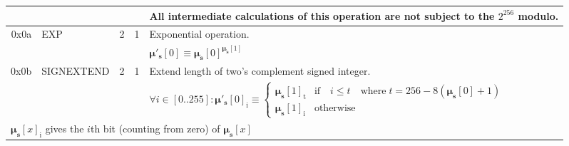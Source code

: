 \documentclass[9pt,oneside]{amsart}
\begin{document}
\begin{tabular*}{\columnwidth}[h]{rlrrl}
&&&& All intermediate calculations of this operation are not subject to the $2^{256}$ modulo. \\
\midrule
0x0a & {\small EXP} & 2 & 1 & Exponential operation. \\
&&&& $\boldsymbol{\mu}'_{\mathbf{s}}[0] \equiv \boldsymbol{\mu}_{\mathbf{s}}[0] ^ {\boldsymbol{\mu}_{\mathbf{s}}[1] }$ \\
\midrule
0x0b & {\small SIGNEXTEND} & 2 & 1 & Extend length of two's complement signed integer. \\
&&&& $ \forall i \in [0..255]: \boldsymbol{\mu}'_{\mathbf{s}}[0]_{\mathrm{i}} \equiv \begin{cases} \boldsymbol{\mu}_{\mathbf{s}}[1]_{\mathrm{t}} &\text{if} \quad i \leqslant t \quad \text{where} \; t = 256 - 8(\boldsymbol{\mu}_{\mathbf{s}}[0] + 1) \\ \boldsymbol{\mu}_{\mathbf{s}}[1]_{\mathrm{i}} &\text{otherwise} \end{cases}$ \\
\multicolumn{5}{l}{$\boldsymbol{\mu}_{\mathbf{s}}[x]_{\mathrm{i}}$ gives the $i$th bit (counting from zero) of $\boldsymbol{\mu}_{\mathbf{s}}[x]$} \vspace{5pt} \\
\midrule
\end{tabular*}
\end{document}
